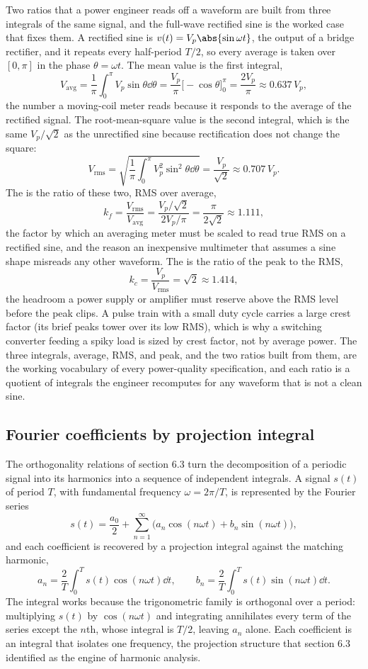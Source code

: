 Two ratios that a power engineer reads off a waveform are built from three
integrals of the same signal, and the full-wave rectified sine is the
worked case that fixes them. A rectified sine is $v(t) = V_{p}\abs{\sin
\omega t}$, the output of a bridge rectifier, and it repeats every
half-period $T/2$, so every average is taken over $[0, \pi]$ in the phase
$\theta = \omega t$. The mean value is the first integral,
\[
V_{\mathrm{avg}} = \frac{1}{\pi}\int_{0}^{\pi} V_{p}\sin\theta\dd\theta =
\frac{V_{p}}{\pi}\bigl[-\cos\theta\bigr]_{0}^{\pi} = \frac{2V_{p}}{\pi}
\approx 0.637\,V_{p},
\]
the number a moving-coil meter reads because it responds to the average of
the rectified signal. The root-mean-square value is the second integral,
which is the same $V_{p}/\sqrt{2}$ as the unrectified sine because
rectification does not change the square:
\[
V_{\mathrm{rms}} = \sqrt{\frac{1}{\pi}\int_{0}^{\pi} V_{p}^{2}\sin^{2}
\theta\dd\theta} = \frac{V_{p}}{\sqrt{2}} \approx 0.707\,V_{p}.
\]
The  is the ratio of these two, RMS over average,
\[
k_{f} = \frac{V_{\mathrm{rms}}}{V_{\mathrm{avg}}} = \frac{V_{p}/\sqrt{2}}
{2V_{p}/\pi} = \frac{\pi}{2\sqrt{2}} \approx 1.111,
\]
the factor by which an averaging meter must be scaled to read true RMS on
a rectified sine, and the reason an inexpensive multimeter that assumes a
sine shape misreads any other waveform. The  is the
ratio of the peak to the RMS,
\[
k_{c} = \frac{V_{p}}{V_{\mathrm{rms}}} = \sqrt{2} \approx 1.414,
\]
the headroom a power supply or amplifier must reserve above the RMS level
before the peak clips. A pulse train with a small duty cycle carries a
large crest factor (its brief peaks tower over its low RMS), which is why
a switching converter feeding a spiky load is sized by crest factor, not
by average power. The three integrals, average, RMS, and peak, and the two
ratios built from them, are the working vocabulary of every power-quality
specification, and each ratio is a quotient of integrals the engineer
recomputes for any waveform that is not a clean sine.

\subsection{Fourier coefficients by projection integral}

The orthogonality relations of section 6.3 turn the decomposition of a
periodic signal into its harmonics into a sequence of independent
integrals. A signal $s(t)$ of period $T$, with fundamental frequency
$\omega = 2\pi/T$, is represented by the Fourier series
\[
s(t) = \frac{a_{0}}{2} + \sum_{n=1}^{\infty}\bigl(a_{n}\cos(n\omega t)
+ b_{n}\sin(n\omega t)\bigr),
\]
and each coefficient is recovered by a projection integral against the
matching harmonic,
\[
a_{n} = \frac{2}{T}\int_{0}^{T} s(t)\cos(n\omega t)\dd t, \qquad
b_{n} = \frac{2}{T}\int_{0}^{T} s(t)\sin(n\omega t)\dd t.
\]
The integral works because the trigonometric family is orthogonal over
a period: multiplying $s(t)$ by $\cos(n\omega t)$ and integrating
annihilates every term of the series except the $n$th, whose integral
is $T/2$, leaving $a_{n}$ alone. Each coefficient is an integral that
isolates one frequency, the projection structure that section 6.3
identified as the engine of harmonic analysis.

